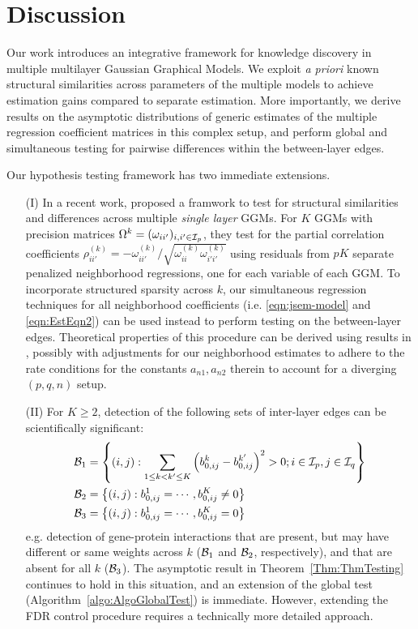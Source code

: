 \section{Discussion}
\label{sec:sec5}
Our work introduces an integrative framework for knowledge discovery in multiple multilayer Gaussian Graphical Models. We exploit {\it a priori} known structural similarities across parameters of the multiple models to achieve estimation gains compared to separate estimation. More importantly, we derive results on the asymptotic distributions of generic estimates of the multiple regression coefficient matrices in this complex setup, and perform global and simultaneous testing for pairwise differences within the between-layer edges.

Our hypothesis testing framework has two immediate extensions.

\begin{itemize}
\item[(I)] In a recent work, \cite{Liu17} proposed a framwork to test for structural similarities and differences across multiple {\it single layer} GGMs. For $K$ GGMs with precision matrices $\Omega^k = (\omega_{ii'})_{i,i' \in {\cal{I}}_p}$, they test for the partial correlation coefficients $\rho_{ii'}^{(k)} = - \omega_{ii'}^{(k)} / \sqrt{\omega_{ii}^{(k)} \omega_{i'i'}^{(k)}}$ using residuals from $pK$ separate penalized neighborhood regressions, one for each variable of each GGM. To incorporate structured sparsity across $k$, our simultaneous regression techniques for all neighborhood coefficients (i.e. \eqref{eqn:jsem-model} and \eqref{eqn:EstEqn2}) can be used instead to perform testing on the between-layer edges. Theoretical properties of this procedure can be derived using results in \cite{Liu17}, possibly with adjustments for our neighborhood estimates to adhere to the rate conditions for the constants $a_{n1}, a_{n2}$ therein to account for a diverging $(p,q,n)$ setup.

\item[(II)] For $K \geq 2$, detection of the following sets of inter-layer edges can be scientifically significant:
%
\begin{align*}
{\cal{B}}_1 &= \left\{ (i,j): \sum_{1 \leq k < k' \leq K} \left(b_{0,ij}^k - b_{0,ij}^{k'} \right)^2 > 0; i \in {\cal{I}}_p, j \in {\cal{I}}_q \right\}\\
{\cal{B}}_2 &= \left\{ (i,j): b_{0,ij}^1 = \cdots, b_{0,ij}^K \neq 0 \right\}\\
{\cal{B}}_3 &= \left\{ (i,j): b_{0,ij}^1 = \cdots, b_{0,ij}^K = 0 \right\}
\end{align*}
%
e.g. detection of gene-protein interactions that are present, but may have different or same weights across $k$ (${\cal{B}}_1$ and ${\cal{B}}_2$, respectively), and that are absent for all $k$ (${\cal{B}}_3$). The asymptotic result in Theorem~\ref{Thm:ThmTesting} continues to hold in this situation, and an extension of the global test (Algorithm~\ref{algo:AlgoGlobalTest}) is immediate. However, extending the FDR control procedure requires a technically more detailed approach.
\end{itemize}

